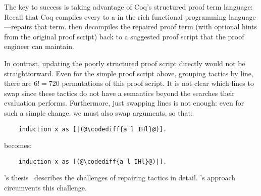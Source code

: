 The key to success is taking advantage of Coq's structured proof term language:
Recall that Coq compiles every  to a  in the rich functional programming language
---\toolnamec repairs that term.
\toolnamec then decompiles the repaired proof term (with optional hints from the original proof script) back 
to a suggested proof script that the proof engineer can maintain.

In contrast, updating the poorly structured proof script directly would not be straightforward.
Even for the simple proof script above, grouping tactics by line, there are $6! = 720$ permutations of this proof script.
It is not clear which lines to swap since these tactics do not have a semantics beyond the searches their evaluation performs.
Furthermore, just swapping lines is not enough: even for such a simple change, we must also swap
arguments, so that:

\begin{lstlisting}
    induction x as [|(@\codediff{a l IHl}@)].
\end{lstlisting}
becomes:

\begin{lstlisting}
    induction x as [(@\codediff{a l IHl}@)|].
\end{lstlisting}
's thesis~\cite{robert2018} describes the challenges of repairing tactics in detail.
\toolnamec's approach circumvents this challenge.



